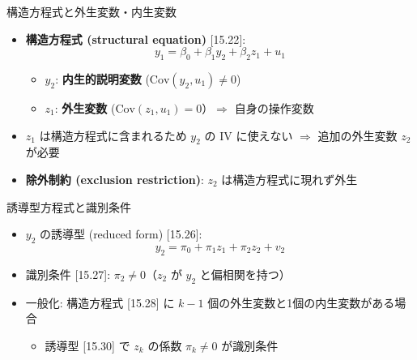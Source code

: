\documentclass[
  ignorenonframetext,
]{beamer}
\providecommand{\tightlist}{%
  \setlength{\itemsep}{0pt}\setlength{\parskip}{0pt}}
\begin{document}
\begin{frame}{構造方程式と外生変数・内生変数}
\label{ux69cbux9020ux65b9ux7a0bux5f0fux3068ux5916ux751fux5909ux6570ux5185ux751fux5909ux6570}
\begin{itemize}
\tightlist
\item
  \textbf{構造方程式 (structural equation)} {[}15.22{]}:
  \[y_1 = \beta_0 + \beta_1 y_2 + \beta_2 z_1 + u_1\]

  \begin{itemize}
  \tightlist
  \item
    \(y_2\): \textbf{内生的説明変数} (\(\text{Cov}(y_2, u_1) \neq 0\))
  \item
    \(z_1\): \textbf{外生変数}
    (\(\text{Cov}(z_1, u_1) = 0\)）\(\Rightarrow\) 自身の操作変数
  \end{itemize}
\item
  \(z_1\) は構造方程式に含まれるため \(y_2\) の IV に使えない
  \(\Rightarrow\) 追加の外生変数 \(z_2\) が必要
\item
  \textbf{除外制約 (exclusion restriction)}: \(z_2\)
  は構造方程式に現れず外生
\end{itemize}
\end{frame}

\begin{frame}{誘導型方程式と識別条件}
\label{ux8a98ux5c0eux578bux65b9ux7a0bux5f0fux3068ux8b58ux5225ux6761ux4ef6}
\begin{itemize}
\tightlist
\item
  \(y_2\) の誘導型 (reduced form) {[}15.26{]}:
  \[y_2 = \pi_0 + \pi_1 z_1 + \pi_2 z_2 + v_2\]
\item
  識別条件 {[}15.27{]}: \(\pi_2 \neq 0\)（\(z_2\) が \(y_2\)
  と偏相関を持つ）
\item
  一般化: 構造方程式 {[}15.28{]} に \(k-1\)
  個の外生変数と1個の内生変数がある場合

  \begin{itemize}
  \tightlist
  \item
    誘導型 {[}15.30{]} で \(z_k\) の係数 \(\pi_k \neq 0\) が識別条件
  \end{itemize}
\end{itemize}
\end{frame}
\end{document}
